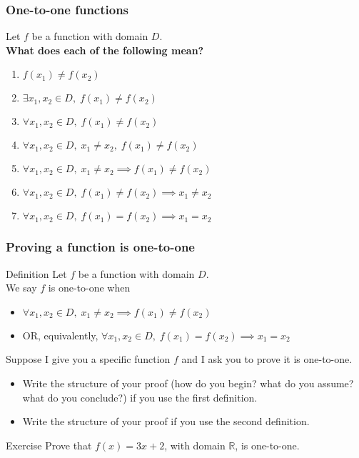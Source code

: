 \documentclass[14pt]{beamer}
\newcommand {\DS} [1] {${\displaystyle #1}$}
\newcommand {\R}{\mathbb{R}}
\newcommand{\p}{\pause}
\newcommand{\setsize}[1]{\fontsize{#1}{#1}\selectfont} %
\newcommand{\smallerfont}{\setsize{13}} %
\begin{document}
\begin{frame}
\frametitle{One-to-one functions}

Let $f$ be a function with domain $D$.  \\
{\bf What does each of the following mean?}
	\begin{enumerate}
		\item  \DS{f(x_1) \neq f(x_2)}
		\item  \DS{\exists x_1, x_2 \in D, \; f(x_1) \neq f(x_2)}
		\item  \DS{\forall x_1, x_2 \in D, \; f(x_1) \neq f(x_2)}
		\item  \DS{\forall x_1, x_2 \in D, \; x_1 \neq x_2, \; f(x_1) \neq f(x_2)}
		\item  \DS{\forall x_1, x_2 \in D, \; x_1 \neq x_2 \implies  f(x_1) \neq f(x_2)}
		\item  \DS{\forall x_1, x_2 \in D, \; f(x_1) \neq f(x_2) \implies  x_1 \neq x_2}
		\item  \DS{\forall x_1, x_2 \in D, \; f(x_1) = f(x_2) \implies x_1 = x_2}
	\end{enumerate}

\end{frame}
\begin{frame}
\frametitle{Proving a function is one-to-one}
\smallerfont

\begin{block}{Definition}
Let $f$ be a function with domain $D$. \\
We say $f$ is one-to-one when 
	\begin{itemize}
		\item   \hfill \DS{\forall x_1, x_2 \in D, \; x_1 \neq x_2 \implies  f(x_1) \neq f(x_2)}
		\item    OR, equivalently, \hfill  \DS{\forall x_1, x_2 \in D, \; f(x_1) = f(x_2) \implies x_1 = x_2}
	\end{itemize}
\end{block}

\vfill  \p

Suppose I give you a specific function $f$ and I ask you to prove it is one-to-one.  \pause
	\begin{itemize} 
		\item  Write the structure of your proof (how do you begin? what do you assume? what do you conclude?) if you use the first definition.
		\item Write the structure of your proof if you use the second definition.
	\end{itemize}
	
\vfill	  \p

\begin{block}{Exercise}
	Prove that $f(x) = 3x + 2$, with domain $\R$, is one-to-one.
\end{block}

\end{frame}
\end{document}
